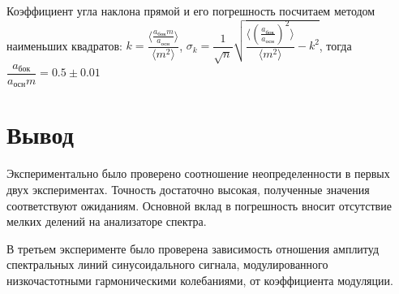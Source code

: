 \documentclass[a4paper, 12pt]{article}
\begin{document}
Коэффициент угла наклона прямой и его погрешность посчитаем методом наименьших квадратов: $k = \dfrac{\langle \frac{a_\text{бок} m}{a_\text{осн}}  \rangle}{\langle m^2 \rangle}$, $\sigma_k = \dfrac{1}{\sqrt{n}} \sqrt{\dfrac{\langle \left( \frac{a_\text{бок}}{a_\text{осн}}\right)^2 \rangle}{\langle m^2 \rangle} - k^2}$, тогда $\dfrac{a_\text{бок}}{a_\text{осн} m} = 0.5 \pm 0.01$

\section{Вывод}

Экспериментально было проверено соотношение неопределенности в первых двух экспериментах. Точность достаточно высокая, полученные значения соответствуют ожиданиям. Основной вклад в погрешность вносит отсутствие мелких делений на анализаторе спектра.

В третьем эксперименте было проверена зависимость отношения амплитуд спектральных линий синусоидального сигнала, модулированного низкочастотными гармоническими колебаниями, от коэффициента модуляции.
\end{document}
